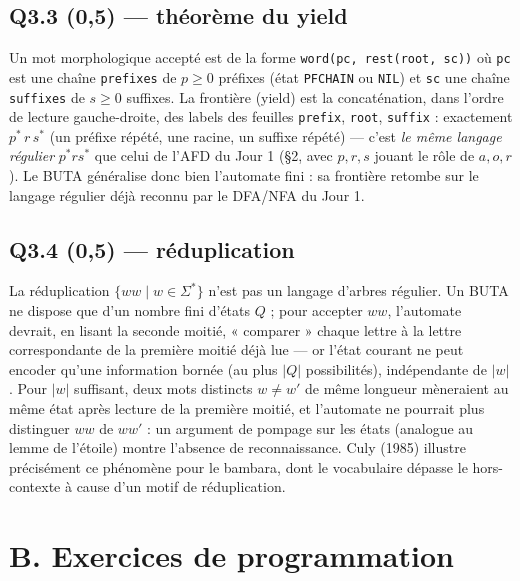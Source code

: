 \documentclass[11pt,a4paper]{scrartcl}
\begin{document}
\subsection*{Q3.3 (0,5) — théorème du yield}
Un mot morphologique accepté est de la forme \texttt{word(pc, rest(root, sc))}
où \texttt{pc} est une chaîne \texttt{prefixes} de $p\geq 0$ préfixes (état
\texttt{PFCHAIN} ou \texttt{NIL}) et \texttt{sc} une chaîne \texttt{suffixes}
de $s\geq 0$ suffixes. La frontière (yield) est la concaténation, dans
l'ordre de lecture gauche-droite, des labels des feuilles \texttt{prefix},
\texttt{root}, \texttt{suffix} : exactement $p^{*}\,r\,s^{*}$ (un préfixe
répété, une racine, un suffixe répété) — c'est \emph{le même langage
régulier} $p^{*}rs^{*}$ que celui de l'AFD du Jour 1 (§2, avec $p,r,s$ jouant
le rôle de $a,o,r$). Le BUTA généralise donc bien l'automate fini : sa
frontière retombe sur le langage régulier déjà reconnu par le DFA/NFA du
Jour 1.

\subsection*{Q3.4 (0,5) — réduplication}
La réduplication $\{ww \mid w\in\Sigma^*\}$ n'est pas un langage d'arbres
régulier. Un BUTA ne dispose que d'un nombre fini d'états $Q$ ; pour accepter
$ww$, l'automate devrait, en lisant la seconde moitié, « comparer » chaque
lettre à la lettre correspondante de la première moitié déjà lue — or l'état
courant ne peut encoder qu'une information bornée (au plus $|Q|$
possibilités), indépendante de $|w|$. Pour $|w|$ suffisant, deux mots
distincts $w\neq w'$ de même longueur mèneraient au même état après lecture
de la première moitié, et l'automate ne pourrait plus distinguer $ww$ de
$ww'$ : un argument de pompage sur les états (analogue au lemme de l'étoile)
montre l'absence de reconnaissance. Culy (1985) illustre précisément ce
phénomène pour le bambara, dont le vocabulaire dépasse le hors-contexte à
cause d'un motif de réduplication.

\section*{B. Exercices de programmation}
\end{document}
